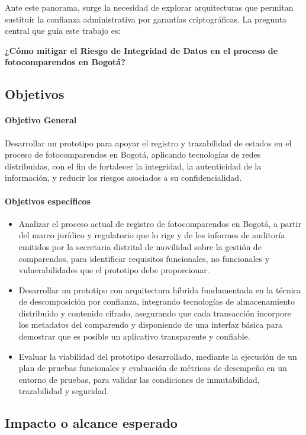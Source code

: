 Ante este panorama, surge la necesidad de explorar arquitecturas que permitan sustituir la confianza administrativa por garantías criptográficas. La pregunta central que guía este trabajo es:

\textbf{¿Cómo mitigar el Riesgo de Integridad de Datos en el proceso de fotocomparendos en Bogotá?} 

\subsection{Objetivos}
\paragraph{Objetivo General}
Desarrollar un prototipo para apoyar el registro y trazabilidad de estados en el proceso de fotocomparendos en Bogotá, aplicando tecnologías de redes distribuidas, con el fin de fortalecer la integridad, la autenticidad de la información, y reducir los riesgos asociados a su confidencialidad.

\paragraph{Objetivos específicos}
\begin{itemize}
    \item Analizar el proceso actual de registro de fotocomparendos en Bogotá, a partir del marco jurídico y regulatorio que lo rige y de los informes de auditoría emitidos por la secretaria distrital de movilidad sobre la gestión de comparendos, para identificar requisitos funcionales, no funcionales y vulnerabilidades que el prototipo debe proporcionar.
    \item Desarrollar un prototipo con arquitectura híbrida fundamentada en la técnica de descomposición por confianza, integrando tecnologías de almacenamiento distribuido y contenido cifrado, asegurando que cada transacción incorpore los metadatos del comparendo y disponiendo de una interfaz básica para demostrar que es posible un aplicativo transparente y confiable.
    \item Evaluar la viabilidad del prototipo desarrollado, mediante la ejecución de un plan de pruebas funcionales y evaluación de métricas de desempeño en un entorno de pruebas, para validar las condiciones de inmutabilidad, trazabilidad y seguridad.
\end{itemize}

\subsection{Impacto o alcance esperado}

